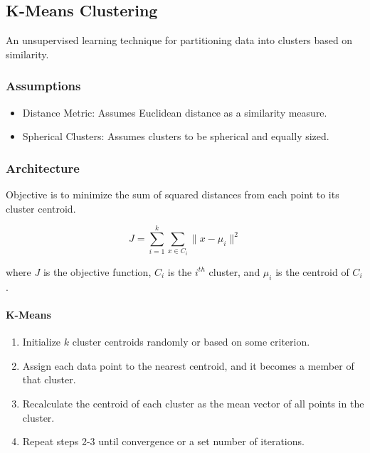 \documentclass[english, threecolumn]{latex4ei/latex4ei_sheet}
\begin{document}
\begin{sectionbox}
\subsection{K-Means Clustering}
An unsupervised learning technique for partitioning data into clusters based on similarity.

\subsubsection{Assumptions}
\begin{itemize}
    \item Distance Metric: Assumes Euclidean distance as a similarity measure.
    \item Spherical Clusters: Assumes clusters to be spherical and equally sized.
\end{itemize}

\subsubsection{Architecture}
Objective is to minimize the sum of squared distances from each point to its cluster centroid.

\[
J = \sum_{i=1}^{k} \sum_{x \in C_i} \|x - \mu_i\|^2
\]

where \(J\) is the objective function, \(C_i\) is the \(i^{th}\) cluster, and \(\mu_i\) is the centroid of \(C_i\).

\paragraph{K-Means}
\begin{enumerate}
    \item Initialize \( k \) cluster centroids randomly or based on some criterion.
    \item Assign each data point to the nearest centroid, and it becomes a member of that cluster.
    \item Recalculate the centroid of each cluster as the mean vector of all points in the cluster.
    \item Repeat steps 2-3 until convergence or a set number of iterations.
\end{enumerate}


\end{sectionbox}
\end{document}
